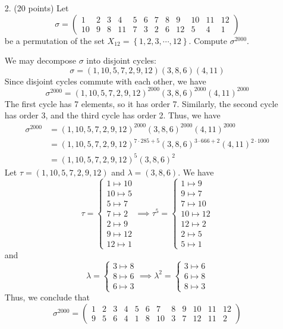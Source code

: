 \documentclass{article}
\begin{document}
\begin{itemize}
	\item[2.] (20 points) Let
		\[\sigma=\begin{pmatrix}
				1 & 2 & 3 & 4 & 5 & 6 & 7 & 8 & 9 & 10 & 11 & 12 \\
				10 & 9 & 8 & 11 & 7 & 3 & 2 & 6 & 12 & 5 & 4 & 1
		\end{pmatrix}\]
		be a permutation of the set $X_{12}=\left\{ 1, 2, 3, \cdots, 12 \right\}.$ Compute $\sigma^{2000}.$
		\begin{soln}
			We may decompose $\sigma$ into disjoint cycles:
			\[\sigma=(1, 10, 5, 7, 2, 9, 12)(3, 8, 6)(4, 11)\]
			Since disjoint cycles commute with each other, we have
			\[\sigma^{2000} = (1, 10, 5, 7, 2, 9, 12)^{2000}(3, 8, 6)^{2000}(4, 11)^{2000}\]
			The first cycle has 7 elements, so it has order 7. Similarly, the second cycle has order 3, and the third cycle has order 2. Thus, we have
			\begin{align*}
				\sigma^{2000} &= (1, 10, 5, 7, 2, 9, 12)^{2000}(3, 8, 6)^{2000}(4, 11)^{2000} \\
				&= (1, 10, 5, 7, 2, 9, 12)^{7\cdot 285 + 5}(3, 8, 6)^{3\cdot 666 + 2}(4, 11)^{2\cdot 1000} \\
				&= (1, 10, 5, 7, 2, 9, 12)^5 (3, 8, 6)^2
			\end{align*}
			Let $\tau=(1, 10, 5, 7, 2, 9, 12)$ and $\lambda=(3, 8, 6).$ We have
			\[\tau=\begin{cases}
					1\mapsto 10 \\
					10\mapsto 5 \\
					5\mapsto 7 \\
					7\mapsto 2 \\
					2\mapsto 9 \\
					9\mapsto 12 \\
					12\mapsto 1
				\end{cases} \implies \tau^5 = \begin{cases}
					1\mapsto 9 \\
					9\mapsto 7 \\
					7\mapsto 10 \\
					10\mapsto 12 \\
					12\mapsto 2 \\
					2\mapsto 5 \\
					5\mapsto 1
			\end{cases}\]
			and
			\[\lambda=\begin{cases}
					3\mapsto 8 \\
					8\mapsto 6 \\
					6\mapsto 3
				\end{cases}\implies \lambda^2 = \begin{cases}
					3\mapsto 6 \\
					6\mapsto 8 \\
					8\mapsto 3
			\end{cases}\]
			Thus, we conclude that \[\sigma^{2000} = \begin{pmatrix}
					1 & 2 & 3 & 4 & 5 & 6 & 7 & 8 & 9 & 10 & 11 & 12 \\
					9 & 5 & 6 & 4 & 1 & 8 & 10 & 3 & 7 & 12 & 11 & 2
			\end{pmatrix}\]
		\end{soln}


\end{itemize}
\end{document}
